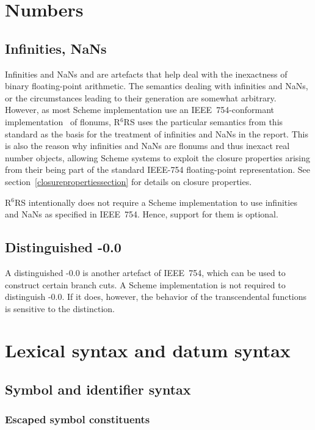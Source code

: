 \documentclass[twoside,twocolumn]{algol60}
\newcommand{\rn}[1]{R$^{#1}$RS}
\begin{document}
\chapter{Numbers}
\label{numberschapter}

\section{Infinities, NaNs}
\label{infinitiesnansection}

Infinities and NaNs and are artefacts that help deal with the
inexactness of binary floating-point arithmetic.  The semantics
dealing with infinities and NaNs, or the circumstances leading to
their generation are somewhat arbitrary.  However, as most Scheme
implementation use an IEEE~754-conformant implementation~\cite{IEEE}
of flonums, \rn{6} uses the particular semantics from this standard as
the basis for the treatment of infinities and NaNs in the report.
This is also the reason why infinities and NaNs are flonums and thus
inexact real number objects, allowing Scheme systems to exploit the closure
properties arising from their being part of the standard IEEE-754
floating-point representation.  See
section~\ref{closurepropertiessection} for details on closure
properties.

\rn{6} intentionally does not require a Scheme implementation to use
infinities and NaNs as specified in IEEE~754.  Hence, support for them
is optional.

\section{Distinguished -0.0}
 
A distinguished -0.0 is another artefact of IEEE~754, which can be
used to construct certain branch cuts.  A Scheme implementation is not
required to distinguish -0.0.  If it does, however, the behavior of
the transcendental functions is sensitive to the distinction.  

\chapter{Lexical syntax and datum syntax}

\section{Symbol and identifier syntax}

\subsection{Escaped symbol constituents}
\end{document}
